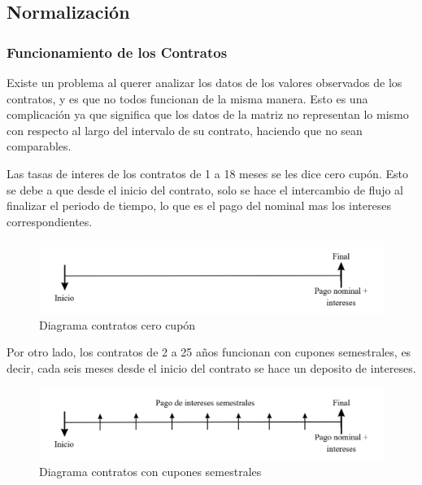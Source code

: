 \subsection{Normalización}

\subsubsection{Funcionamiento de los Contratos}

\qquad Existe un problema al querer analizar los datos de los valores observados de los contratos, y es que no todos funcionan de la misma manera. Esto es una complicación ya que significa que los datos de la matriz no representan lo mismo con respecto al largo del intervalo de su contrato, haciendo que no sean comparables.

\qquad Las tasas de interes de los contratos de 1 a 18 meses se les dice cero cupón. Esto se debe a que desde el inicio del contrato, solo se hace el intercambio de flujo al finalizar el periodo de tiempo, lo que es el pago del nominal mas los intereses correspondientes.\\
\begin{figure}[H]
  \centering
      \includegraphics[scale=0.45]{images/diagrama_contratos_cero_cupon.png}
  \caption{Diagrama contratos cero cupón
  }\label{fig:0cupon}
\end{figure}
\qquad Por otro lado, los contratos de 2 a 25 años funcionan con cupones semestrales, es decir, cada seis meses desde el inicio del contrato se hace un deposito de intereses.
\begin{figure}[H]
  \centering
    \includegraphics[scale=0.45]{images/diagrama_contratos_semestrales.png}
  \caption{Diagrama contratos con cupones semestrales
  }\label{fig:0cupon}
\end{figure}

